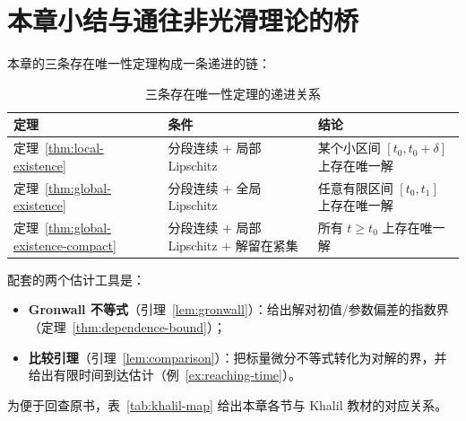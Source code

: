 \section{本章小结与通往非光滑理论的桥}\label{sec:lipschitz-summary}

本章的三条存在唯一性定理构成一条递进的链：

\begin{table}[!htb]
  \centering
  \small
  \begin{tabular}{p{3.6cm}|p{5.4cm}|p{6.2cm}}
    \hline
    定理 & 条件 & 结论 \\
    \hline
    定理~\ref{thm:local-existence} & 分段连续 + 局部 Lipschitz & 某个小区间 $[t_0,t_0+\delta]$ 上存在唯一解 \\
    \hline
    定理~\ref{thm:global-existence} & 分段连续 + 全局 Lipschitz & 任意有限区间 $[t_0,t_1]$ 上存在唯一解 \\
    \hline
    定理~\ref{thm:global-existence-compact} & 分段连续 + 局部 Lipschitz + 解留在紧集 & 所有 $t\ge t_0$ 上存在唯一解 \\
    \hline
  \end{tabular}
  \caption{三条存在唯一性定理的递进关系}
  \label{tab:existence-chain}
\end{table}

配套的两个估计工具是：
\begin{itemize}
  \item \textbf{Gronwall 不等式}（引理~\ref{lem:gronwall}）：给出解对初值/参数偏差的指数界（定理~\ref{thm:dependence-bound}）；
  \item \textbf{比较引理}（引理~\ref{lem:comparison}）：把标量微分不等式转化为对解的界，并给出有限时间到达估计（例~\ref{ex:reaching-time}）。
\end{itemize}

为便于回查原书，表~\ref{tab:khalil-map} 给出本章各节与 Khalil 教材的对应关系。

